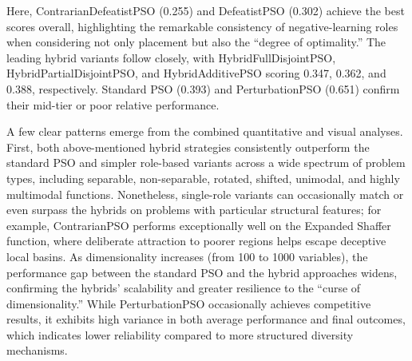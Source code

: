 {Here, ContrarianDefeatistPSO (0.255) and DefeatistPSO (0.302) achieve the best scores overall, highlighting the remarkable consistency of negative-learning roles when considering not only placement but also the ``degree of optimality.'' The leading hybrid variants follow closely, with HybridFullDisjointPSO, HybridPartialDisjointPSO, and HybridAdditivePSO scoring 0.347, 0.362, and 0.388, respectively. Standard PSO (0.393) and PerturbationPSO (0.651) confirm their mid-tier or poor relative performance.

A few clear patterns emerge from the combined quantitative and visual analyses. First,
both above-mentioned hybrid strategies consistently outperform the standard PSO and simpler role-based variants across a wide spectrum of problem types, including separable, non-separable, rotated, shifted, unimodal, and highly multimodal functions. Nonetheless, single-role variants can occasionally match or even surpass the hybrids on problems with particular structural features; for example, ContrarianPSO performs exceptionally well on the Expanded Shaffer function, where deliberate attraction to poorer regions helps escape deceptive local basins. As dimensionality increases (from 100 to 1000 variables), the performance gap between the standard PSO and the hybrid approaches widens, confirming the hybrids’ scalability and greater resilience to the ``curse of dimensionality.'' While PerturbationPSO occasionally achieves competitive results, it exhibits high variance in both average performance and final outcomes, which indicates lower reliability compared to more structured diversity mechanisms.



































}